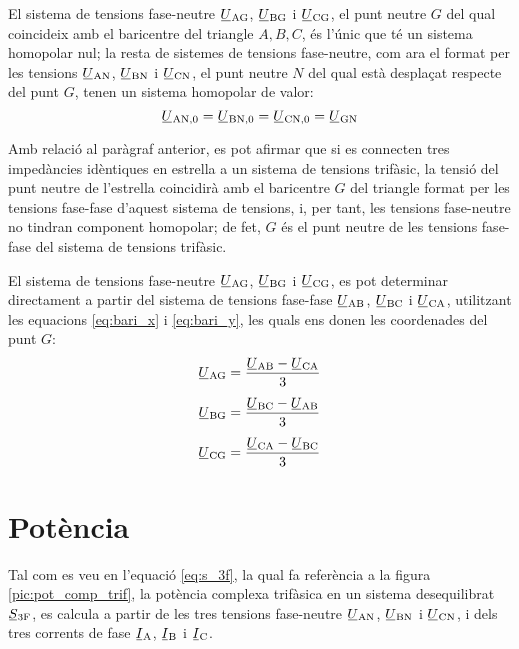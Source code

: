 El sistema de tensions fase-neutre
$\cmplx{U}\ped{AG}$, $\cmplx{U}\ped{BG}$ i $\cmplx{U}\ped{CG}$,
el punt neutre $G$ del qual coincideix amb el baricentre del
triangle $A, B,
 C$, és l'únic que té un sistema homopolar nul; la resta de sistemes de tensions
 fase-neutre, com ara el format per les tensions $\cmplx{U}\ped{AN}$, $\cmplx{U}\ped{BN}$ i $\cmplx{U}\ped{CN}$,
 el punt neutre $N$ del qual està desplaçat respecte del punt $G$, tenen un sistema
 homopolar de valor:
\begin{equation}
    \cmplx{U}\ped{AN,0} = \cmplx{U}\ped{BN,0} =
    \cmplx{U}\ped{CN,0} = \cmplx{U}\ped{GN}\label{eq:tens-hom}
\end{equation}

Amb relació al paràgraf anterior, es pot afirmar que si es
connecten tres impedàncies idèntiques en estrella a un sistema
de tensions trifàsic, la tensió del punt neutre de l'estrella
coincidirà amb el baricentre $G$ del triangle format per les tensions
fase-fase d'aquest sistema de tensions, i, per tant, les tensions fase-neutre no tindran
component homopolar; de fet, $G$ és el punt neutre de les tensions
fase-fase del sistema de tensions trifàsic.

El sistema de tensions fase-neutre
$\cmplx{U}\ped{AG}$, $\cmplx{U}\ped{BG}$ i $\cmplx{U}\ped{CG}$, es pot determinar directament a partir del sistema de tensions fase-fase $\cmplx{U}\ped{AB}$, $\cmplx{U}\ped{BC}$ i $\cmplx{U}\ped{CA}$, utilitzant les equacions \eqref{eq:bari_x} i \eqref{eq:bari_y}, les quals ens donen les coordenades del punt $G$:
\begin{subequations}
\begin{align}
    \cmplx{U}\ped{AG} &= \frac{\cmplx{U}\ped{AB}-\cmplx{U}\ped{CA}}{3}\label{eq:uag}\\[1ex]
    \cmplx{U}\ped{BG} &= \frac{\cmplx{U}\ped{BC}-\cmplx{U}\ped{AB}}{3}\label{eq:ubg}\\[1ex]
    \cmplx{U}\ped{CG} &= \frac{\cmplx{U}\ped{CA}-\cmplx{U}\ped{BC}}{3}\label{eq:ucg}
\end{align}
\end{subequations}

\section{Potència} 

Tal com es veu en l'equació \eqref{eq:s_3f}, la qual fa referència a
la figura \vref{pic:pot_comp_trif}, la potència complexa trifàsica
en un sistema desequilibrat $\cmplx{S}\ped{3F}$, es calcula a partir
de les tres tensions fase-neutre $\cmplx{U}\ped{AN}$,
$\cmplx{U}\ped{BN}$ i $\cmplx{U}\ped{CN}$, i dels tres
corrents de fase $\cmplx{I}\ped{A}$, $\cmplx{I}\ped{B}$ i
$\cmplx{I}\ped{C}$.


